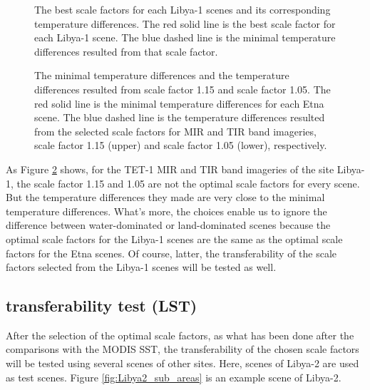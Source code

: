 \begin{figure}[!htbp]
\centering
{}
\hspace{0.5in}
\caption{The best scale factors for each Libya-1 scenes and its corresponding temperature differences. The red solid line is the best scale factor for each Libya-1 scene. The blue dashed line is the minimal temperature differences resulted from that scale factor.}
\label{fig:Libya-1_bsc_mir_tir}
\end{figure}

\begin{figure}[!htbp]
\centering
{}
\hspace{0.5in}
\caption{The minimal temperature differences and the temperature differences resulted from scale factor 1.15 and scale factor 1.05. The red solid line is the minimal temperature differences for each Etna scene. The blue dashed line is the temperature differences resulted from the selected scale factors for MIR and TIR band imageries, scale factor 1.15 (upper) and scale factor 1.05 (lower), respectively.}
\label{fig:Lybia-1_bsc&temCom}
\end{figure}

\noindent As Figure \ref{fig:Lybia-1_bsc&temCom} shows, for the TET-1 MIR and TIR band imageries of the site Libya-1, the scale factor 1.15 and 1.05 are not the optimal scale factors for every scene. But the temperature differences they made are very close to the minimal temperature differences. What's more, the choices enable us to ignore the difference between water-dominated or land-dominated scenes because the optimal scale factors for the Libya-1 scenes are the same as the optimal scale factors for the Etna scenes. Of course, latter, the transferability of the scale factors selected from the Libya-1 scenes will be tested as well.\\


\subsection{transferability test (LST)}
After the selection of the optimal scale factors, as what has been done after the comparisons with the MODIS SST, the transferability of  the chosen scale factors will be tested using several scenes of other sites. Here, scenes of Libya-2 are used as test scenes. Figure \ref{fig:Libya2_sub_areas} is an example scene of Libya-2.\\

